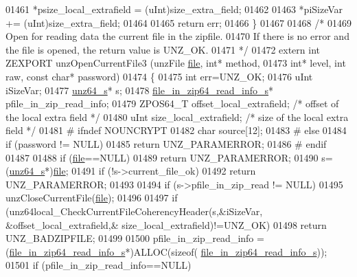 \begin{DoxyCode}
01461     *psize\_local\_extrafield = (uInt)size\_extra\_field;
01462 
01463     *piSizeVar += (uInt)size\_extra\_field;
01464 
01465     \textcolor{keywordflow}{return} err;
01466 \}
01467 
01468 \textcolor{comment}{/*}
01469 \textcolor{comment}{  Open for reading data the current file in the zipfile.}
01470 \textcolor{comment}{  If there is no error and the file is opened, the return value is UNZ\_OK.}
01471 \textcolor{comment}{*/}
01472 \textcolor{keyword}{extern} \textcolor{keywordtype}{int} ZEXPORT unzOpenCurrentFile3 (unzFile \hyperlink{structfile}{file}, \textcolor{keywordtype}{int}* method,
01473                                             \textcolor{keywordtype}{int}* level, \textcolor{keywordtype}{int} raw, \textcolor{keyword}{const} \textcolor{keywordtype}{char}* password)
01474 \{
01475     \textcolor{keywordtype}{int} err=UNZ\_OK;
01476     uInt iSizeVar;
01477     \hyperlink{structunz64__s}{unz64\_s}* s;
01478     \hyperlink{structfile__in__zip64__read__info__s}{file\_in\_zip64\_read\_info\_s}* pfile\_in\_zip\_read\_info;
01479     ZPOS64\_T offset\_local\_extrafield;  \textcolor{comment}{/* offset of the local extra field */}
01480     uInt  size\_local\_extrafield;    \textcolor{comment}{/* size of the local extra field */}
01481 \textcolor{preprocessor}{#    ifndef NOUNCRYPT}
01482     \textcolor{keywordtype}{char} source[12];
01483 \textcolor{preprocessor}{#    else}
01484     \textcolor{keywordflow}{if} (password != NULL)
01485         \textcolor{keywordflow}{return} UNZ\_PARAMERROR;
01486 \textcolor{preprocessor}{#    endif}
01487 
01488     \textcolor{keywordflow}{if} (\hyperlink{structfile}{file}==NULL)
01489         \textcolor{keywordflow}{return} UNZ\_PARAMERROR;
01490     s=(\hyperlink{structunz64__s}{unz64\_s}*)\hyperlink{structfile}{file};
01491     \textcolor{keywordflow}{if} (!s->current\_file\_ok)
01492         \textcolor{keywordflow}{return} UNZ\_PARAMERROR;
01493 
01494     \textcolor{keywordflow}{if} (s->pfile\_in\_zip\_read != NULL)
01495         unzCloseCurrentFile(\hyperlink{structfile}{file});
01496 
01497     \textcolor{keywordflow}{if} (unz64local\_CheckCurrentFileCoherencyHeader(s,&iSizeVar, &offset\_local\_extrafield,&
      size\_local\_extrafield)!=UNZ\_OK)
01498         \textcolor{keywordflow}{return} UNZ\_BADZIPFILE;
01499 
01500     pfile\_in\_zip\_read\_info = (\hyperlink{structfile__in__zip64__read__info__s}{file\_in\_zip64\_read\_info\_s}*)ALLOC(\textcolor{keyword}{sizeof}(
      \hyperlink{structfile__in__zip64__read__info__s}{file\_in\_zip64\_read\_info\_s}));
01501     \textcolor{keywordflow}{if} (pfile\_in\_zip\_read\_info==NULL)

\end{DoxyCode}
